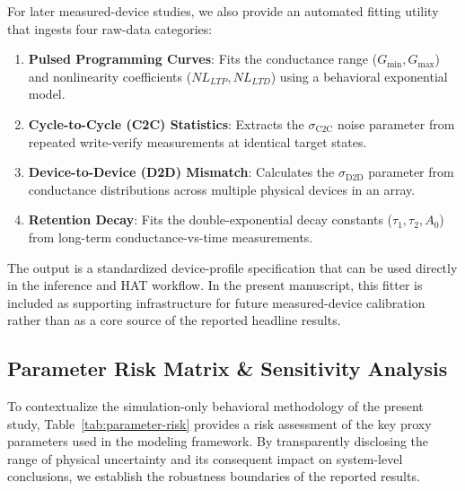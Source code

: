 For later measured-device studies, we also provide an automated fitting utility that ingests four raw-data categories:
\begin{enumerate}
    \item \textbf{Pulsed Programming Curves}: Fits the conductance range ($G_{\min}, G_{\max}$) and nonlinearity coefficients ($NL_{LTP}, NL_{LTD}$) using a behavioral exponential model.
    \item \textbf{Cycle-to-Cycle (C2C) Statistics}: Extracts the $\sigma_{\mathrm{C2C}}$ noise parameter from repeated write-verify measurements at identical target states.
    \item \textbf{Device-to-Device (D2D) Mismatch}: Calculates the $\sigma_{\mathrm{D2D}}$ parameter from conductance distributions across multiple physical devices in an array.
    \item \textbf{Retention Decay}: Fits the double-exponential decay constants ($\tau_1, \tau_2, A_0$) from long-term conductance-vs-time measurements.
\end{enumerate}

The output is a standardized device-profile specification that can be used directly in the inference and HAT workflow. In the present manuscript, this fitter is included as supporting infrastructure for future measured-device calibration rather than as a core source of the reported headline results.

\subsection{Parameter Risk Matrix \& Sensitivity Analysis}
\label{subsec:parameter-risk-matrix}

To contextualize the simulation-only behavioral methodology of the present study, Table~\ref{tab:parameter-risk} provides a risk assessment of the key proxy parameters used in the modeling framework. By transparently disclosing the range of physical uncertainty and its consequent impact on system-level conclusions, we establish the robustness boundaries of the reported results.

